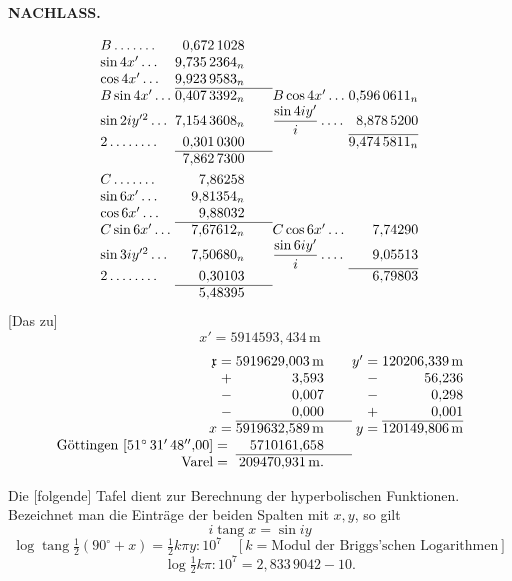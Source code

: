 \par\clearpage
{}\hfill{\small\textbf{NACHLASS.}}\hfill\null\par\medskip
\[
\begin{array}{@{}l@{\;}r@{\qquad}l@{\;}r@{}}
B\,.\,.\,.\,.\,.\,.\,.&0{,}672\,1028&&\\
\sin4x'\,.\,.\,.&9{,}735\,2364_n&&\\
\cos4x'\,.\,.\,.&9{,}923\,9583_n&&\\\cline{2-2}
B\sin4x'\,.\,.\,.&0{,}407\,3392_n&B\cos4x'\,.\,.\,.&0{,}596\,0611_n\\
\sin2iy^{\prime 2}\,.\,.\,.&7{,}154\,3608_n&\dfrac{\sin4iy'}{i}\,.\,.\,.\,.&8{,}878\,5200\\\cline{4-4}
2\,.\,.\,.\,.\,.\,.\,.\,.&0{,}301\,0300&&9{,}474\,5811_n\\\cline{2-2}
&7{,}862\,7300&&\\[3pt]
C\,.\,.\,.\,.\,.\,.\,.&7{,}86258&&\\
\sin6x'\,.\,.\,.&9{,}81354_n&&\\
\cos6x'\,.\,.\,.&9{,}88032&&\\\cline{2-2}
C\sin6x'\,.\,.\,.&7{,}67612_n&C\cos6x'\,.\,.\,.&7{,}74290\\
\sin3iy^{\prime 2}\,.\,.\,.&7{,}50680_n&\dfrac{\sin6iy'}{i}\,.\,.\,.\,.&9{,}05513\\\cline{4-4}
2\,.\,.\,.\,.\,.\,.\,.\,.&0{,}30103&&6{,}79803\\\cline{2-2}
&5{,}48395&&
\end{array}
\]
[Das zu]
\[x'=5914593{,}434\,\mathrm{m}\]
\[
\begin{array}{@{}r@{\;}r@{\qquad}r@{\;}r@{}}
\mathfrak{x}=&5919629{,}003\,\mathrm{m}&y'=&120206{,}339\,\mathrm{m}\\
+&3{,}593&-&56{,}236\\
-&0{,}007&-&0{,}298\\
-&0{,}000&+&0{,}001\\\cline{2-2}\cline{4-4}
x=&5919632{,}589\,\mathrm{m}&y=&120149{,}806\,\mathrm{m}\\
\text{Göttingen }[51^\circ\,31'\,48''{,}00]={}&5710161{,}658&&\\\cline{2-2}
\text{Varel}={}&209470{,}931\,\mathrm{m}.&&
\end{array}
\]
\bigskip
{\centering [30.]\par}
Die [folgende] Tafel dient zur Berechnung der hyperbolischen Funktionen. Bezeichnet man die Einträge der beiden Spalten mit \(x,y\), so gilt
\[i\operatorname{tang}x=\sin iy\]
\[
\log\operatorname{tang}\tfrac12(90^\circ+x)=\tfrac12k\pi y:10^7
\quad[k=\text{Modul der Briggs'schen Logarithmen}]
\]
\[\log\tfrac12k\pi:10^7=2{,}833\,9042-10.\]

